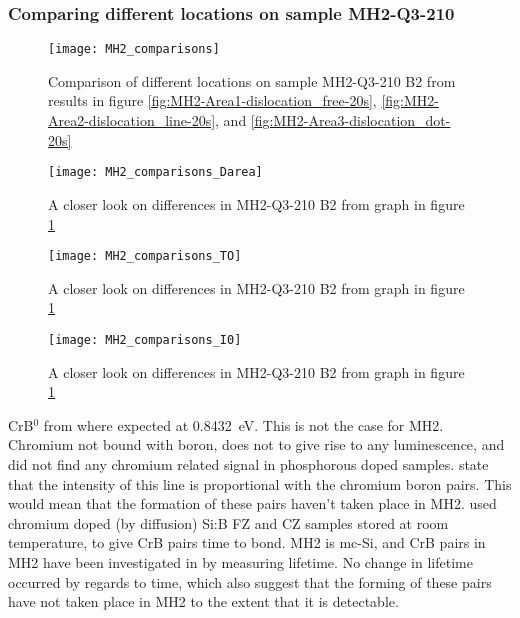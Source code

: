 \subsubsection{Comparing different locations on sample MH2-Q3-210}

\begin{figure}[H]
\centering
\texttt{[image: MH2\_comparisons]}
\caption[MH2-Q3-210 comparisons]{Comparison of different locations on sample MH2-Q3-210 B2 from results in figure \ref{fig:MH2-Area1-dislocation_free-20s}, \ref{fig:MH2-Area2-dislocation_line-20s}, and \ref{fig:MH2-Area3-dislocation_dot-20s} }
\label{fig:MH2_comparisons}%
\end{figure}


\begin{figure}[H]
\centering
\texttt{[image: MH2\_comparisons\_Darea]}
\caption[MH2-Q3-210 comparisons close]{A closer look on differences in MH2-Q3-210 B2 from graph in figure \ref{fig:MH2_comparisons} }
\label{fig:MH2_comparisons_Darea}%
\end{figure}

\begin{figure}[H]
\centering
\texttt{[image: MH2\_comparisons\_TO]}
\caption[MH2-Q3-210 comparisons close]{A closer look on differences in MH2-Q3-210 B2 from graph in figure \ref{fig:MH2_comparisons} } 
\label{fig:MH2_comparisons_TO}%
\end{figure}

\begin{figure}[H]
\centering
\texttt{[image: MH2\_comparisons\_I0]}
\caption[MH2-Q3-210 comparisons close]{A closer look on differences in MH2-Q3-210 B2 from graph in figure \ref{fig:MH2_comparisons} } 
\label{fig:MH2_comparisons_I0}%
\end{figure}


CrB$^0$ from \cite{conzelmann82} where expected at 0.8432~eV. This is not the case for MH2. Chromium not bound with boron, does not to give rise to any luminescence, and \cite{conzelmann82} did not find any chromium related signal in phosphorous doped samples. \cite{conzelmann82} state that the intensity of this line is proportional with the chromium boron pairs. This would mean that the formation of these pairs haven't taken place in MH2. \cite{conzelmann82} used chromium doped (by diffusion) Si:B FZ and CZ samples stored at room temperature, to give CrB pairs time to bond. MH2 is mc-Si, and CrB pairs in MH2 have been investigated in \cite{hystad09} by measuring lifetime. No change in lifetime occurred by regards to time, which also suggest that the forming of these pairs have not taken place in MH2 to the extent that it is detectable.








